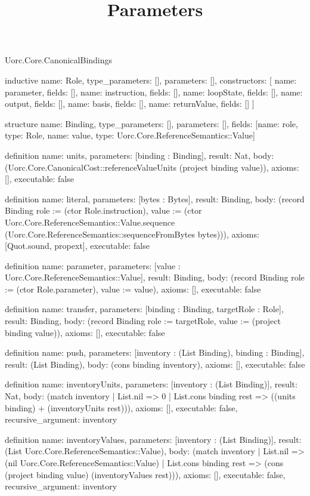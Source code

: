 \begin{lexlean}{Uorc.Core.CanonicalBindings}
\title{Parameters}
\begin{semanticmodule}
inductive{
  name: Role,
  type_parameters: [],
  parameters: [],
  constructors: [
    {name: parameter, fields: []},
    {name: instruction, fields: []},
    {name: loopState, fields: []},
    {name: output, fields: []},
    {name: basis, fields: []},
    {name: returnValue, fields: []}
  ]
}

structure{
  name: Binding,
  type_parameters: [],
  parameters: [],
  fields: [{name: role, type: Role}, {name: value, type: Uorc.Core.ReferenceSemantics::Value}]
}

definition{
  name: units,
  parameters: [binding : Binding],
  result: Nat,
  body: (Uorc.Core.CanonicalCost::referenceValueUnits (project binding value)),
  axioms: [],
  executable: false
}

definition{
  name: literal,
  parameters: [bytes : Bytes],
  result: Binding,
  body: (record Binding {role := (ctor Role.instruction), value := (ctor Uorc.Core.ReferenceSemantics::Value.sequence (Uorc.Core.ReferenceSemantics::sequenceFromBytes bytes))}),
  axioms: [Quot.sound, propext],
  executable: false
}

definition{
  name: parameter,
  parameters: [value : Uorc.Core.ReferenceSemantics::Value],
  result: Binding,
  body: (record Binding {role := (ctor Role.parameter), value := value}),
  axioms: [],
  executable: false
}

definition{
  name: transfer,
  parameters: [binding : Binding, targetRole : Role],
  result: Binding,
  body: (record Binding {role := targetRole, value := (project binding value)}),
  axioms: [],
  executable: false
}

definition{
  name: push,
  parameters: [inventory : (List Binding), binding : Binding],
  result: (List Binding),
  body: (cons binding inventory),
  axioms: [],
  executable: false
}

definition{
  name: inventoryUnits,
  parameters: [inventory : (List Binding)],
  result: Nat,
  body: (match inventory
    | List.nil => 0
    | List.cons binding rest => ((units binding) + (inventoryUnits rest))),
  axioms: [],
  executable: false,
  recursive_argument: inventory
}

definition{
  name: inventoryValues,
  parameters: [inventory : (List Binding)],
  result: (List Uorc.Core.ReferenceSemantics::Value),
  body: (match inventory
    | List.nil => (nil Uorc.Core.ReferenceSemantics::Value)
    | List.cons binding rest => (cons (project binding value) (inventoryValues rest))),
  axioms: [],
  executable: false,
  recursive_argument: inventory
}


\end{semanticmodule}
\end{lexlean}
